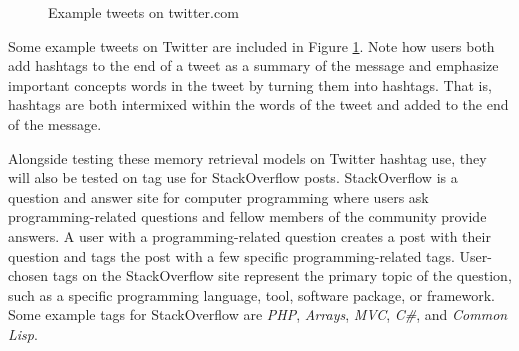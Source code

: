 \documentclass[man,floatsintext,donotrepeattitle]{apa6}
\begin{document}
\begin{figure}[!htbp]
  {%
    \setlength{\fboxsep}{0pt}%
    \setlength{\fboxrule}{1pt}%
    \hfill
    \hfill
    \hfill
    \vfill
    \hfill
    \hfill
    \hfill
    \caption{Example tweets on twitter.com}
    \label{figTweetExample}
  }%
\end{figure}

Some example tweets on Twitter are included in Figure \ref{figTweetExample}.
Note how users both add hashtags to the end of a tweet as a summary of the message and emphasize important concepts words in the tweet by turning them into hashtags.
That is, hashtags are both intermixed within the words of the tweet and added to the end of the message.

Alongside testing these memory retrieval models on Twitter hashtag use, they will also be tested on tag use for StackOverflow posts.
StackOverflow is a question and answer site for computer programming where users ask programming-related questions and fellow members of the community provide answers.
A user with a programming-related question creates a post with their question and tags the post with a few specific programming-related tags. 
User-chosen tags on the StackOverflow site represent the primary topic of the question, such as a specific programming language, tool, software package, or framework.
Some example tags for StackOverflow are \emph{PHP}, \emph{Arrays}, \emph{MVC}, \emph{C\#}, and \emph{Common Lisp}.
\end{document}
